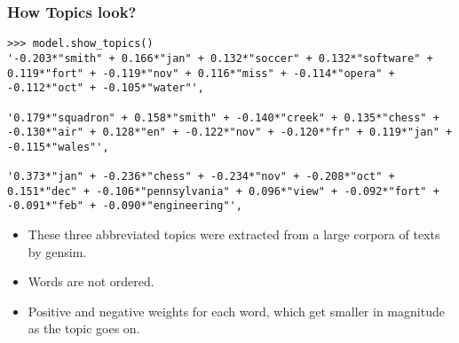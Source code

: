 \begin{frame}[fragile]\frametitle{How Topics look?}
\begin{lstlisting}
>>> model.show_topics()
'-0.203*"smith" + 0.166*"jan" + 0.132*"soccer" + 0.132*"software" + 0.119*"fort" + -0.119*"nov" + 0.116*"miss" + -0.114*"opera" + -0.112*"oct" + -0.105*"water"',

'0.179*"squadron" + 0.158*"smith" + -0.140*"creek" + 0.135*"chess" + -0.130*"air" + 0.128*"en" + -0.122*"nov" + -0.120*"fr" + 0.119*"jan" + -0.115*"wales"', 

'0.373*"jan" + -0.236*"chess" + -0.234*"nov" + -0.208*"oct" + 0.151*"dec" + -0.106*"pennsylvania" + 0.096*"view" + -0.092*"fort" + -0.091*"feb" + -0.090*"engineering"',
\end{lstlisting}
  \begin{itemize}
  	\item These three abbreviated topics were extracted from a large corpora of texts by gensim.
	\item Words are not ordered.
	\item Positive and negative weights for each word, which get smaller in magnitude as the topic goes on. 

  \end{itemize}
\end{frame}

